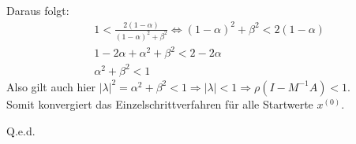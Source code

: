 Daraus folgt:
\begin{align*}
&1<\frac{2(1-\alpha)}{(1-\alpha)^2+\beta^2} \Leftrightarrow (1-\alpha)^2+\beta^2<2(1-\alpha)\\
&1-2\alpha+\alpha^2+\beta^2<2-2\alpha\\
&\alpha^2+\beta^2<1
\end{align*}
Also gilt auch hier $|\lambda|^2=\alpha^2+\beta^2<1 \Rightarrow |\lambda|<1 \Rightarrow \rho(I-M^{-1}A)<1$.\\
Somit konvergiert das Einzelschrittverfahren für alle Startwerte $x^{(0)}$.
\begin{flushright}
Q.e.d.
\end{flushright}
